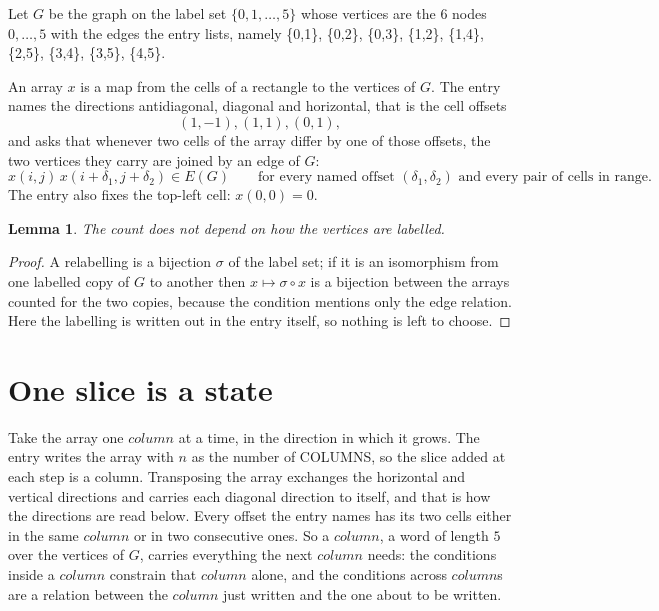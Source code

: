 \documentclass[11pt,a4paper]{article}
\theoremstyle{plain}
\newtheorem{lemma}[theorem]{Lemma}
\theoremstyle{definition}
\begin{document}
Let $G$ be the graph on the label set $\{0,1,\dots,5\}$ whose vertices are the $6$ nodes $0,\dots,5$ with the edges the entry lists, namely \{0,1\}, \{0,2\}, \{0,3\}, \{1,2\}, \{1,4\}, \{2,5\}, \{3,4\}, \{3,5\}, \{4,5\}.

An array $x$ is a map from the cells of a rectangle to the vertices of $G$. The entry names the
directions antidiagonal, diagonal and horizontal, that is the cell offsets
\[
(1,-1), (1,1), (0,1),
\]
and asks that whenever two cells of the array differ by one of those offsets, the two vertices
they carry are joined by an edge of $G$:
\[
x(i,j)\,x(i+\delta_1,j+\delta_2)\in E(G)\qquad
\text{for every named offset } (\delta_1,\delta_2)\text{ and every pair of cells in range.}
\]
The entry also fixes the top-left cell: $x(0,0)=0$.

\begin{lemma}\label{lem:label}
The count does not depend on how the vertices are labelled.
\end{lemma}

\begin{proof}
A relabelling is a bijection $\sigma$ of the label set; if it is an isomorphism from one
labelled copy of $G$ to another then $x\mapsto\sigma\circ x$ is a bijection between the arrays
counted for the two copies, because the condition mentions only the edge relation.
Here the labelling is written out in the entry itself, so nothing is left to choose.
\end{proof}

\section{One slice is a state}

Take the array one $column$ at a time, in the direction in which it grows. The entry writes the array with $n$ as the number of COLUMNS, so the slice added at each step is a column. Transposing the array exchanges the horizontal and vertical directions and carries each diagonal direction to itself, and that is how the directions are read below.
Every offset the entry names has its two cells either in the same $column$ or in two
consecutive ones. So a $column$, a word of length $5$ over the vertices of $G$, carries
everything the next $column$ needs: the conditions inside a $column$ constrain that
$column$ alone, and the conditions across $column$s are a relation between the
$column$ just written and the one about to be written.
\end{document}

